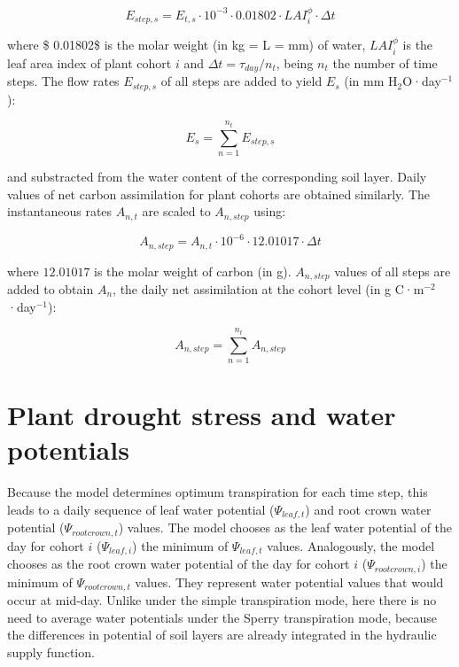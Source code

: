 \documentclass[]{book}
\begin{document}
\begin{equation}
E_{step,s} = E_{t,s}\cdot 10^{-3} \cdot 0.01802 \cdot LAI_i^{\phi}\cdot \Delta t
\end{equation}

where \$ 0.01802\$ is the molar weight (in kg = L = mm) of water,
\(LAI_i^{\phi}\) is the leaf area index of plant cohort \(i\) and
\(\Delta t = \tau_{day}/n_t\), being \(n_t\) the number of time steps.
The flow rates \(E_{step,s}\) of all steps are added to yield \(E_s\)
(in mm H\(_2\)O·day\(^{-1}\)):

\begin{equation}
E_{s} = \sum_{n=1}^{n_t} {E_{step,s}}
\end{equation}

and substracted from the water content of the corresponding soil layer.
Daily values of net carbon assimilation for plant cohorts are obtained
similarly. The instantaneous rates \(A_{n, t}\) are scaled to
\(A_{n,step}\) using:

\begin{equation}
A_{n,step} = A_{n, t} \cdot 10^{-6} \cdot 12.01017 \cdot \Delta t
\end{equation}

where \(12.01017\) is the molar weight of carbon (in g). \(A_{n, step}\)
values of all steps are added to obtain \(A_n\), the daily net
assimilation at the cohort level (in g C·m\(^{-2}\)·day\(^{-1}\)):

\begin{equation}
A_{n,step} = \sum_{n=1}^{n_t} {A_{n,step}}
\end{equation}

\section{Plant drought stress and water
potentials}\label{plant-drought-stress-and-water-potentials}

Because the model determines optimum transpiration for each time step,
this leads to a daily sequence of leaf water potential
(\(\Psi_{leaf,t}\)) and root crown water potential
(\(\Psi_{rootcrown,t}\)) values. The model chooses as the leaf water
potential of the day for cohort \(i\) (\(\Psi_{leaf,i}\)) the minimum of
\(\Psi_{leaf,t}\) values. Analogously, the model chooses as the root
crown water potential of the day for cohort \(i\)
(\(\Psi_{rootcrown,i}\)) the minimum of \(\Psi_{rootcrown,t}\) values.
They represent water potential values that would occur at mid-day.
Unlike under the simple transpiration mode, here there is no need to
average water potentials under the Sperry transpiration mode, because
the differences in potential of soil layers are already integrated in
the hydraulic supply function.
\end{document}
